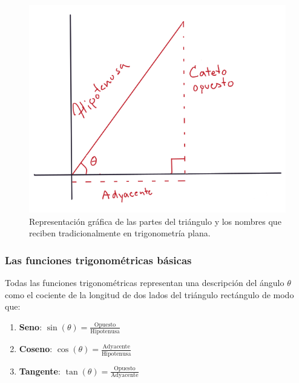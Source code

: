 \documentclass[
]{book}
\providecommand{\tightlist}{%
  \setlength{\itemsep}{0pt}\setlength{\parskip}{0pt}}
\begin{document}
\begin{figure}

{\centering \includegraphics{Unidad-I/nomenclatura} 

}

\caption{Representación gráfica de las partes del triángulo y los nombres que reciben tradicionalmente en trigonometría plana.}\label{fig:nomen-trig}
\end{figure}

\hypertarget{las-funciones-trigonomuxe9tricas-buxe1sicas}{%
\subsubsection{Las funciones trigonométricas básicas}\label{las-funciones-trigonomuxe9tricas-buxe1sicas}}

Todas las funciones trigonométricas representan una descripción del ángulo \(\theta\) como el cociente de la longitud de dos lados del triángulo rectángulo de modo que:

\begin{enumerate}
\def\labelenumi{\arabic{enumi}.}
\tightlist
\item
  \textbf{Seno}: \(\sin(\theta) = \frac{\mathrm{Opuesto}}{\mathrm{Hipotenusa}}\)
\item
  \textbf{Coseno}: \(\cos(\theta) = \frac{\mathrm{Adyacente}}{\mathrm{Hipotenusa}}\)
\item
  \textbf{Tangente}: \(\tan(\theta) = \frac{\mathrm{Opuesto}}{\mathrm{Adyacente}}\)
\end{enumerate}
\end{document}

